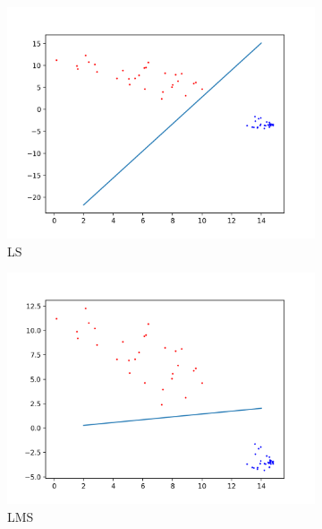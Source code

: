 \documentclass[12pt, a4paper]{article}
\begin{document}
\begin{figure}[H]
    \centering
    \begin{subfigure}{0.45\textwidth}
        \includegraphics[width=\textwidth]{recursos/3/ls_small}
        \caption{LS}
    \end{subfigure}
    \begin{subfigure}{0.45\textwidth}
        \includegraphics[width=\textwidth]{recursos/3/lms_small}
        \caption{LMS }
    \end{subfigure}
    ~
     \begin{subfigure}{0.45\textwidth}

\end{subfigure}
\end{figure}
\end{document}

